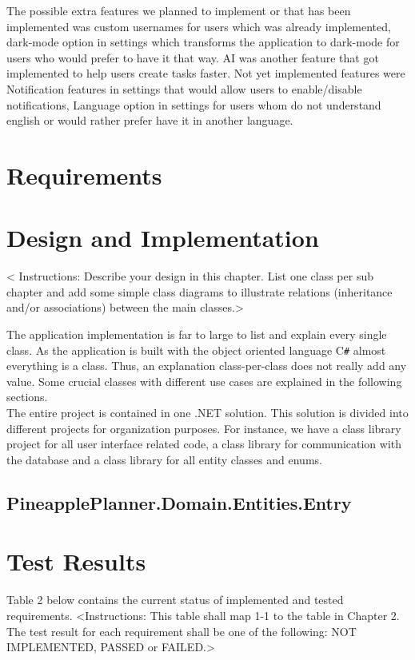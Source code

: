 \documentclass{article}
\begin{document}
The possible extra features we planned to implement or that has been implemented was custom usernames for users which was already implemented, dark-mode option in settings which transforms the application to dark-mode for users who would prefer to have it that way. AI was another feature that got implemented to help users create tasks faster. Not yet implemented features were Notification features in settings that would allow users to enable/disable notifications, Language option in settings for users whom do not understand english or would rather prefer have it in another language.

\section{Requirements}
\section{Design and Implementation}
< Instructions: Describe your design in this chapter.
List one class per sub chapter and add some simple class diagrams to illustrate relations (inheritance and/or associations) between the main classes.>

The application implementation is far to large to list and explain every single class.
As the application is built with the object oriented language C\verb|#| almost everything is a class.
Thus, an explanation class-per-class does not really add any value.
Some crucial classes with different use cases are explained in the following sections.
\\
The entire project is contained in one .NET solution.
This solution is divided into different projects for organization purposes.
For instance, we have a class library project for all user interface related code, a class library for communication with the database and a class library for all entity classes and enums.

\subsection{PineapplePlanner.Domain.Entities.Entry}

\bigbreak

\section{Test Results}
Table 2 below contains the current status of implemented and tested requirements.
<Instructions: This table shall map 1-1 to the table in Chapter 2. The test result for each requirement shall be one of the following: NOT IMPLEMENTED, PASSED or FAILED.>
\end{document}
